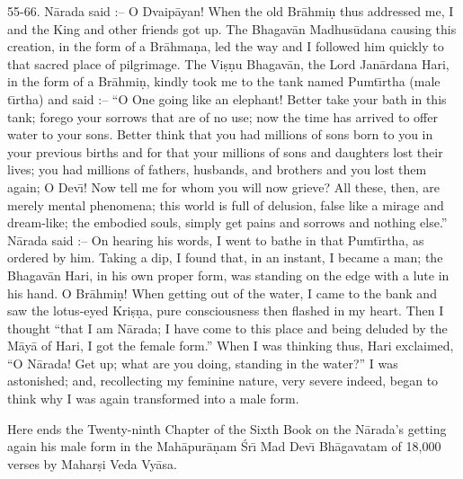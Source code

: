 55-66. N\=arada said :-- O Dvaip\=ayan! When the old Br\=ahmi\d{n} thus addressed me, I and the King and other friends got up. The Bhagav\=an Madhus\=udana causing this creation, in the form of a Br\=ahma\d{n}a, led the way and I followed him quickly to that sacred place of pilgrimage. The Vi\d{s}\d{n}u Bhagav\=an, the Lord Jan\=ardana Hari, in the form of a Br\=ahmi\d{n}, kindly took me to the tank named Pumt\={\i}rtha (male t\={\i}rtha) and said :-- ``O One going like an elephant! Better take your bath in this tank; forego your sorrows that are of no use; now the time has arrived to offer water to your sons. Better think that you had millions of sons born to you in your previous births and for that your millions of sons and daughters lost their lives; you had millions of fathers, husbands, and brothers and you lost them again; O Dev\={\i}! Now tell me for whom you will now grieve? All these, then, are merely mental phenomena; this world is full of delusion, false like a mirage and dream-like; the embodied souls, simply get pains and sorrows and nothing else.'' N\=arada said :-- On hearing his words, I went to bathe in that Pumt\={\i}rtha, as ordered by him. Taking a dip, I found that, in an instant, I became a man; the Bhagav\=an Hari, in his own proper form, was standing on the edge with a lute in his hand. O Br\=ahmi\d{n}! When getting out of the water, I came to the bank and saw the lotus-eyed Kri\d{s}\d{n}a, pure consciousness then flashed in my heart. Then I thought ``that I am N\=arada; I have come to this place and being deluded by the M\=ay\=a of Hari, I got the female form.'' When I was thinking thus, Hari exclaimed, ``O N\=arada! Get up; what are you doing, standing in the water?'' I was astonished; and, recollecting my feminine nature, very severe indeed, began to think why I was again transformed into a male form.

Here ends the Twenty-ninth Chapter of the Sixth Book on the N\=arada's getting again his male form in the Mah\=apur\=a\d{n}am \'Sr\={\i} Mad Dev\={\i} Bh\=agavatam of 18,000 verses by Mahar\d{s}i Veda Vy\=asa.



